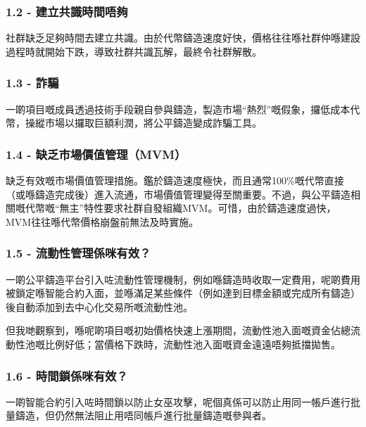 \documentclass[
]{article}
\begin{document}
\subsubsection{1.2 -
建立共識時間唔夠}\label{ux5efaux7acbux5171ux8b58ux6642ux9593ux5514ux5920}

社群缺乏足夠時間去建立共識。由於代幣鑄造速度好快，價格往往喺社群仲喺建設過程時就開始下跌，導致社群共識瓦解，最終令社群解散。

\subsubsection{1.3 - 詐騙}\label{ux8a50ux9a19}

一啲項目嘅成員透過技術手段親自參與鑄造，製造市場``熱烈''嘅假象，攞低成本代幣，操縱市場以攞取巨額利潤，將公平鑄造變成詐騙工具。

\subsubsection{1.4 -
缺乏市場價值管理（MVM）}\label{ux7f3aux4e4fux5e02ux5834ux50f9ux503cux7ba1ux7406mvm}

缺乏有效嘅市場價值管理措施。鑑於鑄造速度極快，而且通常100\%嘅代幣直接（或喺鑄造完成後）進入流通，市場價值管理變得至關重要。不過，與公平鑄造相關嘅代幣嘅``無主''特性要求社群自發組織MVM。可惜，由於鑄造速度過快，MVM往往喺代幣價格崩盤前無法及時實施。

\subsubsection{1.5 -
流動性管理係咪有效？}\label{ux6d41ux52d5ux6027ux7ba1ux7406ux4fc2ux54aaux6709ux6548}

一啲公平鑄造平台引入咗流動性管理機制，例如喺鑄造時收取一定費用，呢啲費用被鎖定喺智能合約入面，並喺滿足某些條件（例如達到目標金額或完成所有鑄造）後自動添加到去中心化交易所嘅流動性池。

但我哋觀察到，喺呢啲項目嘅初始價格快速上漲期間，流動性池入面嘅資金佔總流動性池嘅比例好低；當價格下跌時，流動性池入面嘅資金遠遠唔夠抵擋拋售。

\subsubsection{1.6 -
時間鎖係咪有效？}\label{ux6642ux9593ux9396ux4fc2ux54aaux6709ux6548}

一啲智能合約引入咗時間鎖以防止女巫攻擊，呢個真係可以防止用同一帳戶進行批量鑄造，但仍然無法阻止用唔同帳戶進行批量鑄造嘅參與者。
\end{document}
